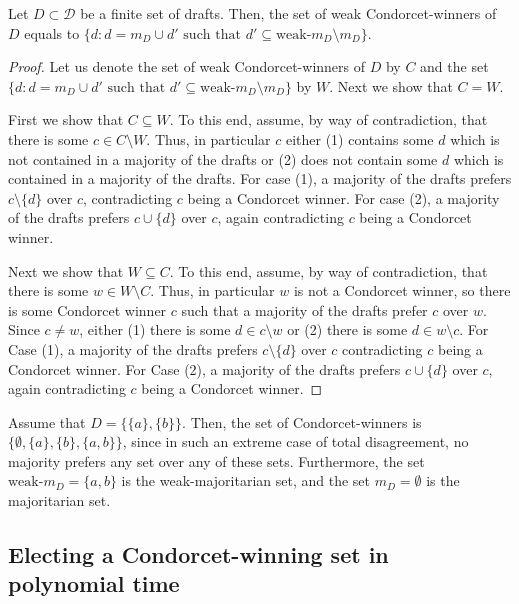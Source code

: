 \documentclass{llncs}
\newcommand{\calD}{\mathcal{D}}
\begin{document}
\begin{lemma}
  Let $D \subset \calD$ be a finite set of drafts.
  Then, the set of weak Condorcet-winners of $D$ equals to $\{ d : d = m_D \cup d'  \textrm{ such that }  d' \subseteq \textrm{weak-}m_D \setminus m_D \}$.
\end{lemma}

\begin{proof}
%
Let us denote the set of weak Condorcet-winners of $D$ by $C$ and the set $\{ d : d = m_D \cup d'  \textrm{ such that }  d' \subseteq \textrm{weak-}m_D \setminus m_D \}$ by $W$. Next we show that $C = W$.

First we show that $C \subseteq W$.
To this end, assume, by way of contradiction, that there is some $c \in C \setminus W$. Thus, in particular $c$ either (1) contains some $d$ which is not contained in a majority of the drafts or (2) does not contain some $d$ which is contained in a majority of the drafts.
For case (1), a majority of the drafts prefers  $c \setminus \{d\}$ over $c$, contradicting $c$ being a Condorcet winner. For case (2), a majority of the drafts prefers $c \cup \{d\}$ over $c$, again contradicting $c$ being a Condorcet winner.

Next we show that $W \subseteq C$.
To this end, assume, by way of contradiction, that there is some $w \in W \setminus C$. Thus, in particular $w$ is not a Condorcet winner, so there is some Condorcet winner $c$ such that a majority of the drafts prefer $c$ over $w$. Since $c \neq w$, either (1) there is some $d \in c \setminus w$ or (2) there is some $d \in w \setminus c$.
For Case (1), a majority of the drafts prefers $c \setminus \{d\}$ over $c$ contradicting $c$ being a Condorcet winner.
For Case (2), a majority of the drafts prefers $c \cup \{d\}$ over $c$, again contradicting $c$ being a Condorcet winner.
%
\end{proof}

\begin{example}
%
Assume that $D = \{ \{a\}, \{b\} \}$.
Then, the set of Condorcet-winners is
$\{ \emptyset, \{a\}, \{b\}, \{a,b\} \}$, since in such an extreme case of total disagreement, no majority prefers any set over any of these sets.
Furthermore, the set $\textrm{weak-}m_D = \{a, b\}$ is the weak-majoritarian set, and the set $m_D = \emptyset$ is the majoritarian set.
%
\end{example}

\subsection{Electing a Condorcet-winning set in polynomial time}
\end{document}
